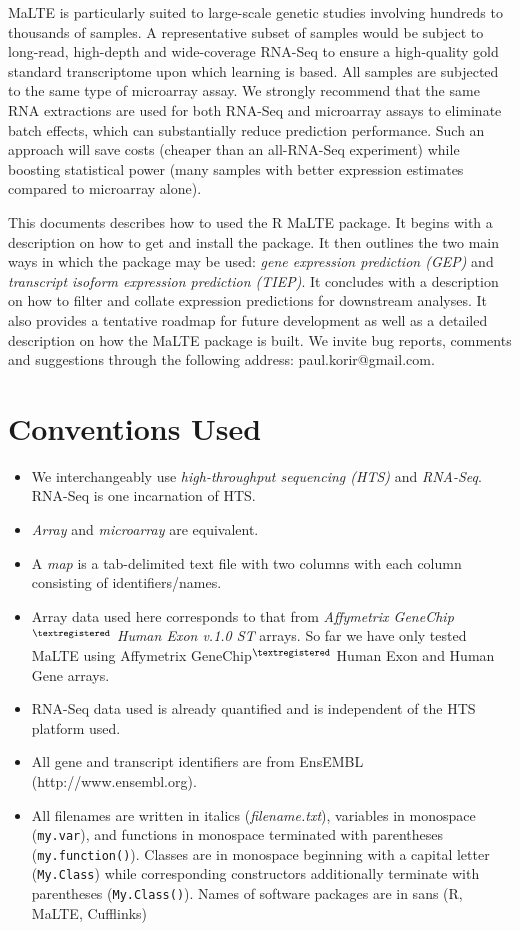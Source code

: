 \documentclass[a4paper,12pt]{article}
\begin{document}
MaLTE is particularly suited to large-scale genetic studies involving hundreds to thousands of samples. A representative subset of samples would be subject to long-read, high-depth and wide-coverage RNA-Seq to ensure a high-quality gold standard transcriptome upon which learning is based. All samples are subjected to the same type of microarray assay. We strongly recommend that the same RNA extractions are used for both RNA-Seq and microarray assays to eliminate batch effects, which can substantially reduce prediction performance. Such an approach will save costs (cheaper than an all-RNA-Seq experiment) while boosting statistical power (many samples with better expression estimates compared to microarray alone).

This documents describes how to used the R MaLTE package. It begins with a description on how to get and install the package. It then outlines the two main ways in which the package may be used: \textit{gene expression prediction (GEP)} and \textit{transcript isoform expression prediction (TIEP)}. It concludes with a description on how to filter and collate expression predictions for downstream analyses. It also provides a tentative roadmap for future development as well as a detailed description on how the MaLTE package is built. We invite bug reports, comments and suggestions through the following address: paul.korir@gmail.com.

\section{Conventions Used}
\begin{itemize}
\item We interchangeably use \textit{high-throughput sequencing (HTS)} and \textit{RNA-Seq}. RNA-Seq is one incarnation of HTS.
\item \textit{Array} and \textit{microarray} are equivalent.
\item A \textit{map} is a tab-delimited text file with two columns with each column consisting of identifiers/names.
\item Array data used here corresponds to that from \textit{Affymetrix GeneChip$^{\textregistered}$ Human Exon v.1.0 ST} arrays. So far we have only tested MaLTE using Affymetrix GeneChip$^{\textregistered}$ Human Exon and Human Gene arrays.
\item RNA-Seq data used is already quantified and is independent of the HTS platform used.
\item All gene and transcript identifiers are from EnsEMBL (http://www.ensembl.org).
\item All filenames are written in italics (\textit{filename.txt}), variables in monospace (\texttt{my.var}), and functions in monospace terminated with parentheses (\texttt{my.function()}). Classes are in monospace beginning with a capital letter (\texttt{My.Class}) while corresponding constructors additionally terminate with parentheses (\texttt{My.Class()}). Names of software packages are in sans (\textsf{R}, \textsf{MaLTE}, \textsf{Cufflinks})
\end{itemize}
\end{document}
